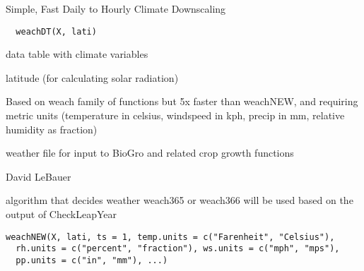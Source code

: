 \documentclass[letterpaper]{book}
\begin{document}
%
\begin{Description}\relax
Simple, Fast Daily to Hourly Climate Downscaling
\end{Description}
%
\begin{Usage}
\begin{verbatim}
  weachDT(X, lati)
\end{verbatim}
\end{Usage}
%
\begin{Arguments}
\begin{ldescription}
\item[\code{X}] data table with climate variables

\item[\code{lati}] latitude (for calculating solar radiation)
\end{ldescription}
\end{Arguments}
%
\begin{Details}\relax
Based on weach family of functions but 5x faster than
weachNEW, and requiring metric units (temperature in
celsius, windspeed in kph, precip in mm, relative
humidity as fraction)
\end{Details}
%
\begin{Value}
weather file for input to BioGro and related crop growth
functions
\end{Value}
%
\begin{Author}\relax
David LeBauer
\end{Author}
%
\begin{Description}\relax
algorithm that decides weather weach365 or weach366 will be
used based on the output of CheckLeapYear
\end{Description}
%
\begin{Usage}
\begin{verbatim}
weachNEW(X, lati, ts = 1, temp.units = c("Farenheit", "Celsius"),
  rh.units = c("percent", "fraction"), ws.units = c("mph", "mps"),
  pp.units = c("in", "mm"), ...)
\end{verbatim}
\end{Usage}
%
\end{document}
